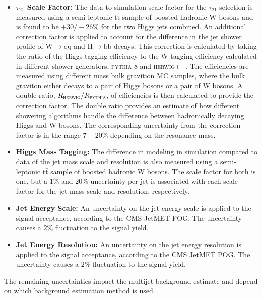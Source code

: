\begin{itemize}
\item \textbf{$\tau_{21}$ Scale Factor:} The data to simulation scale factor for the $\tau_{21}$ selection is measured using a semi-leptonic $\mathrm{t\bar{t}}$ sample of boosted hadronic W bosons and is found to be $+30/-26\%$ for the two Higgs jets combined. An additional correction factor is applied to account for the difference in the jet shower profile of $\mathrm{W}\rightarrow \mathrm{q\bar{q}}$ and $\mathrm{H}\rightarrow \mathrm{b\bar{b}}$ decays. This correction is calculated by taking the ratio of the Higgs-tagging efficiency to the W-tagging efficiency calculated in different shower generators, \textsc{pythia 8} and \textsc{herwig++}. The efficiencies are measured using different mass bulk gravition MC samples, where the bulk graviton either decays to a pair of Higgs bosons or a pair of W bosons. A double ratio, $R_{\textsc{herwig}}/R_{\textsc{pythia}}$, of efficiencies is then calculated to provide the correction factor. The double ratio provides an estimate of how different showering algorithms handle the difference between hadronically decaying Higgs and W bosons. The corresponding uncertainty from the correction factor is in the range $7-20\%$ depending on the resonance mass.

\item \textbf{Higgs Mass Tagging:} The difference in modeling in simulation compared to data of the jet mass scale and resolution is also measured using a semi-leptonic $\mathrm{t\bar{t}}$ sample of boosted hadronic W bosons. The scale factor for both is one, but a $1\%$ and $20\%$ uncertainty per jet is associated with each scale factor for the jet mass scale and resolution, respectively.

\item \textbf{Jet Energy Scale:} An uncertainty on the jet energy scale is applied to the signal acceptance, according to the CMS JetMET POG. The uncertainty causes a $2\%$ fluctuation to the signal yield.

\item \textbf{Jet Energy Resolution:} An uncertainty on the jet energy resolution is applied to the signal acceptance, according to the CMS JetMET POG. The uncertainty causes a $2\%$ fluctuation to the signal yield.

\end{itemize}

The remaining uncertainties impact the multijet background estimate and depend on which background estimation method is used.

